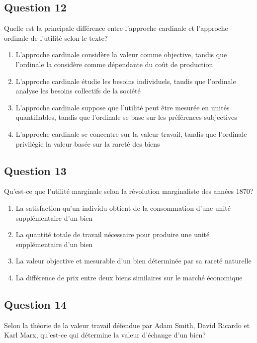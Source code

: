 \documentclass[12pt,a4paper]{article}
\begin{document}
\subsection*{Question 12}
Quelle est la principale différence entre l'approche cardinale et l'approche ordinale de l'utilité selon le texte?

\begin{enumerate}[label=\Alph*., leftmargin=*]
\item L'approche cardinale considère la valeur comme objective, tandis que l'ordinale la considère comme dépendante du coût de production
\item L'approche cardinale étudie les besoins individuels, tandis que l'ordinale analyse les besoins collectifs de la société
\item L'approche cardinale suppose que l'utilité peut être mesurée en unités quantifiables, tandis que l'ordinale se base sur les préférences subjectives
\item L'approche cardinale se concentre sur la valeur travail, tandis que l'ordinale privilégie la valeur basée sur la rareté des biens
\end{enumerate}

\bigskip


\subsection*{Question 13}
Qu'est-ce que l'utilité marginale selon la révolution marginaliste des années 1870?

\begin{enumerate}[label=\Alph*., leftmargin=*]
\item La satisfaction qu'un individu obtient de la consommation d'une unité supplémentaire d'un bien
\item La quantité totale de travail nécessaire pour produire une unité supplémentaire d'un bien
\item La valeur objective et mesurable d'un bien déterminée par sa rareté naturelle
\item La différence de prix entre deux biens similaires sur le marché économique
\end{enumerate}

\bigskip


\subsection*{Question 14}
Selon la théorie de la valeur travail défendue par Adam Smith, David Ricardo et Karl Marx, qu'est-ce qui détermine la valeur d'échange d'un bien?
\end{document}
